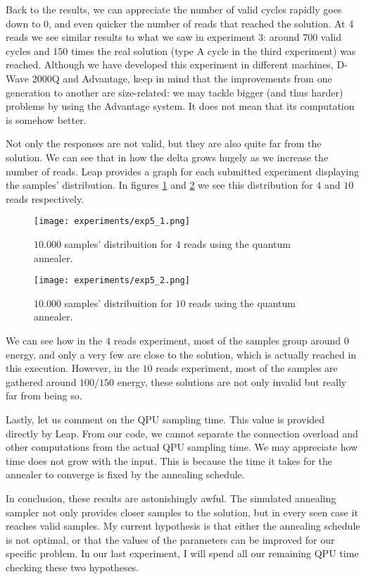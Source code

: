 Back to the results, we can appreciate the number of valid cycles rapidly goes down to $0$, and even quicker the number of reads that reached the solution. At 4 reads we see similar results to what we saw in experiment 3: around $700$ valid cycles and $150$ times the real solution (type A cycle in the third experiment) was reached. Although we have developed this experiment in different machines, D-Wave 2000Q and Advantage, keep in mind that the improvements from one generation to another are size-related: we may tackle bigger (and thus harder) problems by using the Advantage system. It does not mean that its computation is somehow better.

Not only the responses are not valid, but they are also quite far from the solution. We can see that in how the delta grows hugely as we increase the number of reads. Leap provides a graph for each submitted experiment displaying the samples' distribution. In figures \ref{fig:exp5_1} and \ref{fig:exp5_2} we see this distribution for $4$ and $10$ reads respectively. 

\begin{figure}[H]
	\texttt{[image: experiments/exp5\_1.png]}
	\centering
	\caption{$10.000$ samples' distribuition for $4$ reads using the quantum annealer.}
	\label{fig:exp5_1}
\end{figure}

\begin{figure}[H]
	\texttt{[image: experiments/exp5\_2.png]}
	\centering
	\caption{$10.000$ samples' distribuition for $10$ reads using the quantum annealer.}
	\label{fig:exp5_2}
\end{figure}

We can see how in the $4$ reads experiment, most of the samples group around $0$ energy, and only a very few are close to the solution, which is actually reached in this execution. However, in the $10$ reads experiment, most of the samples are gathered around $100/150$ energy, these solutions are not only invalid but really far from being so.

Lastly, let us comment on the QPU sampling time. This value is provided directly by Leap. From our code, we cannot separate the connection overload and other computations from the actual QPU sampling time. We may appreciate how time does not grow with the input. This is because the time it takes for the annealer to converge is fixed by the annealing schedule.

In conclusion, these results are astonishingly awful. The simulated annealing sampler not only provides closer samples to the solution, but in every seen case it reaches valid samples. My current hypothesis is that either the annealing schedule is not optimal, or that the values of the parameters can be improved for our specific problem. In our last experiment, I will spend all our remaining QPU time checking these two hypotheses.


